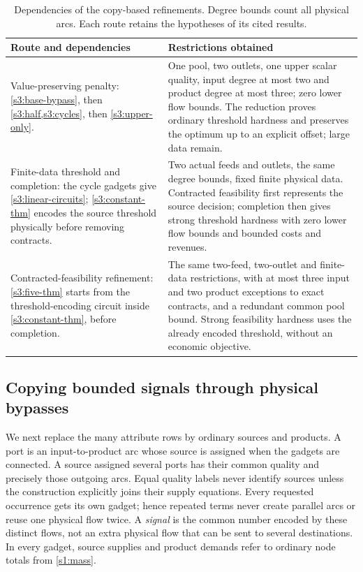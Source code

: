 \begin{table}[!ht]
\centering
\small
\begin{tabular}{@{}>{\raggedright\arraybackslash}p{.46\linewidth}>{\raggedright\arraybackslash}p{.49\linewidth}@{}}
\toprule
Route and dependencies & Restrictions obtained\\
\midrule
Value-preserving penalty: \cref{s3:base-bypass}, then
\cref{s3:half,s3:cycles}, then \cref{s3:upper-only}.
& One pool, two outlets, one upper scalar quality, input degree at most
two and product degree at most three; zero lower flow bounds.
The reduction proves ordinary threshold hardness and preserves the
optimum up to an explicit offset; large data remain.\\
\addlinespace
Finite-data threshold and completion: the cycle gadgets give
\cref{s3:linear-circuits}; \cref{s3:constant-thm} encodes the source
threshold physically before removing contracts.
& Two actual feeds and outlets, the same degree bounds, fixed finite
physical data. Contracted feasibility first represents the source
decision; completion then gives strong threshold hardness with zero
lower flow bounds and bounded costs and revenues.\\
\addlinespace
Contracted-feasibility refinement: \cref{s3:five-thm} starts from the
threshold-encoding circuit inside \cref{s3:constant-thm}, before
completion.
& The same two-feed, two-outlet and finite-data restrictions, with
at most three input and two product exceptions to exact contracts, and a
redundant common pool bound. Strong feasibility hardness uses the
already encoded threshold, without an economic objective.\\
\bottomrule
\end{tabular}
\caption{Dependencies of the copy-based refinements. Degree bounds count
all physical arcs. Each route retains the hypotheses of its cited results.}
\label{s3:refinement-guide}
\end{table}

\subsection{Copying bounded signals through physical bypasses}\label{s3:copy}

We next replace the many attribute rows by ordinary sources and products.
A port is an input-to-product arc whose source is assigned when the gadgets
are connected. A source assigned several ports has their common quality
and precisely those outgoing arcs. Equal quality labels never identify
sources unless the construction explicitly joins their supply equations.
Every requested occurrence gets its own gadget; hence repeated terms
never create parallel arcs or reuse one physical flow twice. A \emph{signal}
is the common number encoded by these distinct flows, not an extra
physical flow that can be sent to several destinations. In every gadget,
source supplies and product demands refer to ordinary node totals from
\cref{s1:mass}.

